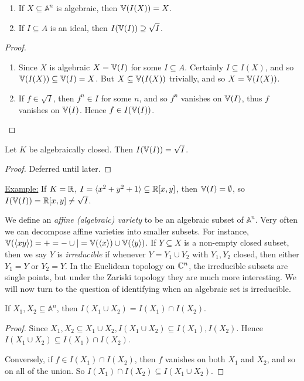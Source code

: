 \documentclass[10pt,a4paper,rgb]{article}
\begin{document}
\begin{proposition}
\item
\begin{enumerate}
\item If $X \subseteq \mathbb{A}^n$ is algebraic, then $\mathbb{V}(I(X)) = X$.
\item If $I \subseteq A$ is an ideal, then $I(\mathbb{V}(I)) \supseteq \sqrt{I}$.
\end{enumerate}
\end{proposition}
\begin{proof}
\item
\begin{enumerate}
\item Since $X$ is algebraic $X = \mathbb{V}(I)$ for some $I \subseteq A$. Certainly $I \subseteq I(X)$, and so $\mathbb{V}(I(X)) \subseteq \mathbb{V}(I) = X$. But $X \subseteq \mathbb{V}(I(X))$ trivially, and so $X = \mathbb{V}(I(X))$.

\item If $f \in \sqrt{I}$, then $f^n \in I$ for some $n$, and so $f^n$ vanishes on $\mathbb{V}(I)$, thus $f$ vanishes on $\mathbb{V}(I)$. Hence $f \in I(\mathbb{V}(I))$.
\end{enumerate}
\end{proof}
\begin{theorem}
Let $K$ be algebraically closed. Then $I(\mathbb{V}(I)) = \sqrt{I}$.
\end{theorem}
\begin{proof}
Deferred until later.
\end{proof}

\hspace*{-1em}\underline{Example:} If $K = \mathbb{R}$, $I = \langle x^2+y^2+1 \rangle \subseteq \mathbb{R}[x,y]$, then $\mathbb{V}(I) = \emptyset$, so $I(\mathbb{V}(I)) = \mathbb{R}[x,y] \neq \sqrt{I}$.

\hspace*{-1em}We define an \emph{affine (algebraic) variety} to be an algebraic subset of $\mathbb{A}^n$. Very often we can decompose affine varieties into smaller subsets. For instance, $\mathbb{V}(\langle xy \rangle) = + = - \cup | = \mathbb{V}(\langle x \rangle) \cup \mathbb{V}(\langle y \rangle)$. If $Y \subseteq X$ is a non-empty closed subset, then we say $Y$ is \emph{irreducible} if whenever $Y = Y_1 \cup Y_2$ with $Y_1, Y_2$ closed, then either $Y_1 = Y$ or $Y_2 = Y$.  In the Euclidean topology on $\mathbb{C}^n$, the irreducible subsets are single points, but under the Zariski topology they are much more interesting. We will now turn to the question of identifying when an algebraic set is irreducible.

\begin{proposition}
If $X_1, X_2 \subseteq \mathbb{A}^n$, then $I(X_1 \cup X_2) = I(X_1) \cap I(X_2)$.
\end{proposition}
\begin{proof}
Since $X_1, X_2 \subseteq X_1 \cup X_2, I(X_1 \cup X_2) \subseteq I(X_1), I(X_2)$. Hence $I(X_1 \cup X_2) \subseteq I(X_1) \cap I(X_2)$.

Conversely, if $f \in I(X_1) \cap I(X_2)$, then $f$ vanishes on both $X_1$ and $X_2$, and so on all of the union. So $I(X_1) \cap I(X_2) \subseteq I(X_1 \cup X_2)$.
\end{proof}
\end{document}
